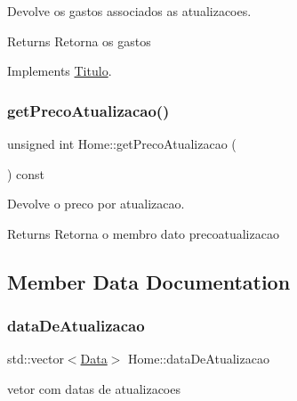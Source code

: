 Devolve os gastos associados as atualizacoes. 

\begin{DoxyReturn}{Returns}
Retorna os gastos 
\end{DoxyReturn}


Implements \mbox{\hyperlink{class_titulo_a9272448eec05cd9c026c54824bf2e727}{Titulo}}.

\mbox{\label{class_home_a52f37198fb17a321dbcac93d1c35b537}} 
\subsubsection{\texorpdfstring{get\+Preco\+Atualizacao()}{getPrecoAtualizacao()}}
{\footnotesize\ttfamily unsigned int Home\+::get\+Preco\+Atualizacao (\begin{DoxyParamCaption}{ }\end{DoxyParamCaption}) const}



Devolve o preco por atualizacao. 

\begin{DoxyReturn}{Returns}
Retorna o membro dato precoatualizacao 
\end{DoxyReturn}


\subsection{Member Data Documentation}
\mbox{\label{class_home_a49b932bcc604234155ef43457a05f44c}} 
\subsubsection{\texorpdfstring{data\+De\+Atualizacao}{dataDeAtualizacao}}
{\footnotesize\ttfamily std\+::vector$<$\mbox{\hyperlink{class_data}{Data}}$>$ Home\+::data\+De\+Atualizacao\hspace{0.3cm}{\ttfamily [private]}}

vetor com datas de atualizacoes \mbox{\label{class_home_a9066555b77a5d4fca0b9be1a0daa949b}} 
